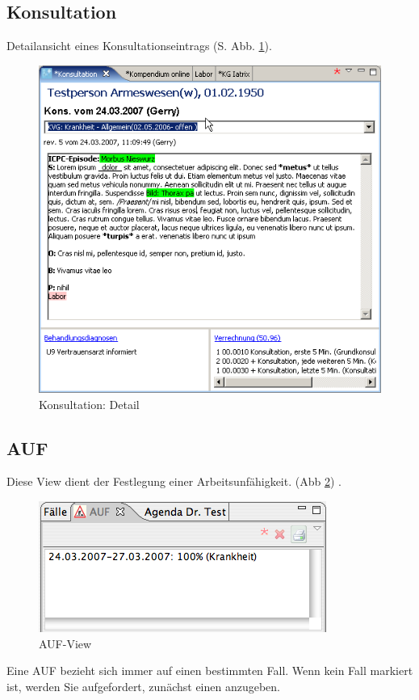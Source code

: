 \subsection{Konsultation}
 \label{konsview}
Detailansicht eines Konsultationseintrags (S. Abb. \ref{fig:konsdetail}).


\begin{figure}[htp]
\begin{center}
  \includegraphics{images/konsview}
  \caption{Konsultation: Detail}
  \label{fig:konsdetail}
\end{center}
\end{figure}

\subsection{AUF}
Diese View dient der Festlegung einer Arbeitsunfähigkeit. (Abb \ref{fig:auf})
 . %
\begin{figure}[htp]
\begin{center}
  \includegraphics{images/aufview}
  \caption{AUF-View}
  \label{fig:auf}
\end{center}
\end{figure}
Eine AUF bezieht sich immer auf einen bestimmten Fall. Wenn kein Fall markiert
ist, werden Sie aufgefordert, zunächst einen anzugeben.


